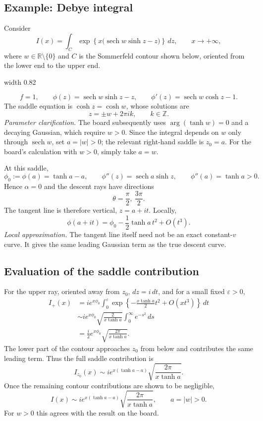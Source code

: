 \documentclass[11pt,a4paper]{article}
\begin{document}
\subsection*{Example: Debye integral}
Consider
\[
    I(x)=\int_C \exp\!\left\{x\bigl(\operatorname{sech}w\sinh z-z\bigr)\right\}\,dz,
    \qquad x\to+\infty,
\]
where $w\in\mathbb R\setminus\{0\}$ and $C$ is the Sommerfeld contour
shown below, oriented from the lower end to the upper end.
\begin{center}
    \pdfximage width 0.82\linewidth {figures/asymptotic-lecture10/sommerfeld-contour.png}
    \leavevmode\pdfrefximage\pdflastximage
\end{center}
\[
    f=1,\qquad \phi(z)=\operatorname{sech}w\sinh z-z,
    \qquad \phi'(z)=\operatorname{sech}w\cosh z-1.
\]
The saddle equation is $\cosh z=\cosh w$, whose solutions are
\[
    z=\pm w+2\pi i k,\qquad k\in\mathbb Z.
\]
\noindent\textit{Parameter clarification.}
The board subsequently uses $\arg(\tanh w)=0$ and a decaying Gaussian,
which require $w>0$. Since the integral depends on $w$ only through
$\operatorname{sech}w$, set $a=|w|>0$; the relevant right-hand saddle is
$z_0=a$. For the board's calculation with $w>0$, simply take $a=w$.

At this saddle,
\[
    \phi_0:=\phi(a)=\tanh a-a,
    \qquad \phi''(z)=\operatorname{sech}a\sinh z,
    \qquad \phi''(a)=\tanh a>0.
\]
Hence $\alpha=0$ and the descent rays have directions
\[
    \theta=\frac\pi2,\ \frac{3\pi}2.
\]
The tangent line is therefore vertical, $z=a+it$. Locally,
\[
    \phi(a+it)=\phi_0-\frac12\tanh a\,t^2+O(t^3).
\]
\noindent\textit{Local approximation.}
The tangent line itself need not be an exact constant-$v$ curve.
It gives the same leading Gaussian term as the true descent curve.

\clearpage
\subsection*{Evaluation of the saddle contribution}
For the upper ray, oriented away from $z_0$, $dz=i\,dt$, and for a
small fixed $\varepsilon>0$,
\begin{align*}
    I_+(x)
    &=i e^{x\phi_0}\int_0^\varepsilon
        \exp\!\left\{-\frac{x\tanh a}{2}t^2+O(xt^3)\right\}\,dt\\
    &\sim i e^{x\phi_0}\sqrt{\frac{2}{x\tanh a}}
        \int_0^\infty e^{-s^2}\,ds\\
    &=\frac{i}{2}e^{x\phi_0}\sqrt{\frac{2\pi}{x\tanh a}}.
\end{align*}
The lower part of the contour approaches $z_0$ from below and contributes
the same leading term. Thus the full saddle contribution is
\[
    I_{z_0}(x)\sim i e^{x(\tanh a-a)}
        \sqrt{\frac{2\pi}{x\tanh a}}.
\]
Once the remaining contour contributions are shown to be negligible,
\[
    \boxed{I(x)\sim i e^{x(\tanh a-a)}
        \sqrt{\frac{2\pi}{x\tanh a}},\qquad a=|w|>0.}
\]
For $w>0$ this agrees with the result on the board.
\end{document}
